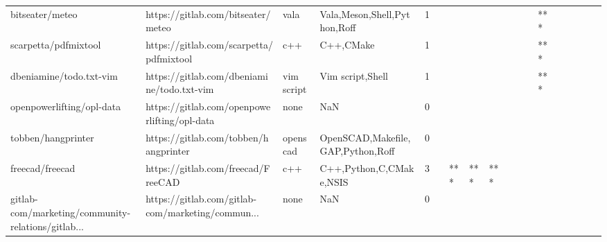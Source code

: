\begin{tabular}{llllrlllllllllllll}
bitseater/meteo                                    &                 https://gitlab.com/bitseater/meteo &              vala &                       Vala,Meson,Shell,Python,Roff &       1 &         &        &           &                &                 &        &           &       *** &          &          &       &              &          \\
scarpetta/pdfmixtool                               &            https://gitlab.com/scarpetta/pdfmixtool &               c++ &                                          C++,CMake &       1 &         &        &           &                &                 &        &           &       *** &          &          &       &              &          \\
dbeniamine/todo.txt-vim                            &         https://gitlab.com/dbeniamine/todo.txt-vim &        vim script &                                   Vim script,Shell &       1 &         &        &           &                &                 &        &           &       *** &          &          &       &              &          \\
openpowerlifting/opl-data                          &       https://gitlab.com/openpowerlifting/opl-data &              none &                                                NaN &       0 &         &        &           &                &                 &        &           &           &          &          &       &              &          \\
tobben/hangprinter                                 &              https://gitlab.com/tobben/hangprinter &          openscad &                  OpenSCAD,Makefile,GAP,Python,Roff &       0 &         &        &           &                &                 &        &           &           &          &          &       &              &          \\
freecad/freecad                                    &                 https://gitlab.com/freecad/FreeCAD &               c++ &                            C++,Python,C,CMake,NSIS &       3 &         &    *** &       *** &            *** &                 &        &           &           &          &          &       &              &          \\
gitlab-com/marketing/community-relations/gitlab... &  https://gitlab.com/gitlab-com/marketing/commun... &              none &                                                NaN &       0 &         &        &           &                &                 &        &           &           &          &          &       &              &          \\

\end{tabular}
